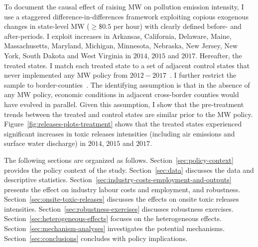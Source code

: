 \documentclass[12pt, english]{article}
\begin{document}
    To document the causal effect of raising MW on pollution emission intensity, I use a staggered difference-in-differences framework exploiting copious exogenous changes in state-level MW ($\geq \$0.5$ per hour) with clearly defined before- and after-periods. I exploit increases in Arkansas, California, Delaware, Maine, Massachusetts, Maryland, Michigan, Minnesota, Nebraska, New Jersey, New York, South Dakota and West Virginia in $2014$, $2015$ and $2017$. Hereafter, the treated states. I match each treated state to a set of adjacent control states that never implemented any MW policy from $2012-2017$~\parencite{gopalan2021state}. I further restrict the sample to border-counties~\parencite{dube2010minimum}. The identifying assumption is that in the absence of any MW policy, economic conditions in adjacent cross-border counties would have evolved in parallel. Given this assumption, I show that the pre-treatment trends between the treated and control states are similar prior to the MW policy. Figure~\ref{fig:releases-plots-treatment} shows that the treated states experienced significant increases in toxic releases intensities (including air emissions and surface water discharge) in $2014$, $2015$ and $2017$. %


    The following sections are organized as follows. Section~\ref{sec:policy-context} provides the policy context of the study. Section~\ref{sec:data} discusses the data and descriptive statistics. Section~\ref{sec:industry-costs-employment-and-outputs} presents the effect on industry labour costs and employment, and robustness. Section~\ref{sec:onsite-toxic-releases} discusses the effects on onsite toxic releases intensities. Section~\ref{sec:robustness-exercises} discusses robustness exercises. Section~\ref{sec:heterogeneous-effects} focuses on the heterogeneous effects. Section~\ref{sec:mechanism-analyses} investigates the potential mechanisms. Section~\ref{sec:conclusions} concludes with policy implications.
\end{document}
